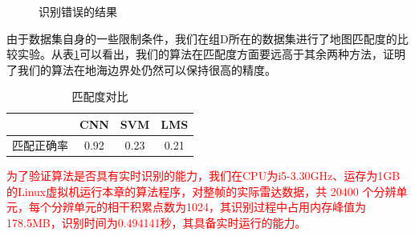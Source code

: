 \begin{figure}[H]
	\centering
	\hfil
	\caption{识别错误的结果}
	\label{fig:error_result}
\end{figure}

由于数据集自身的一些限制条件，我们在组D所在的数据集进行了地图匹配度的比较实验。从表\ref{tab:method_pair}可以看出，我们的算法在匹配度方面要远高于其余两种方法，证明了我们的算法在地海边界处仍然可以保持很高的精度。
\begin{table}[H]
	\renewcommand{\arraystretch}{1.3}
	\caption{匹配度对比}
	\label{tab:method_pair}
	\centering
	\begin{tabular}{c|ccc}
		\hline
		& CNN & SVM & LMS \\
		\hline
		匹配正确率 & 0.92 & 0.23 & 0.21 \\
		\hline
	\end{tabular}
\end{table}

\textcolor{red}{
为了验证算法是否具有实时识别的能力，我们在CPU为i5-3.30GHz、运存为1GB的Linux虚拟机运行本章的算法程序，对整帧的实际雷达数据，共 20400 个分辨单元，每个分辨单元的相干积累点数为1024，其识别过程中占用内存峰值为178.5MB，识别时间为0.494141秒，其具备实时运行的能力。
}


